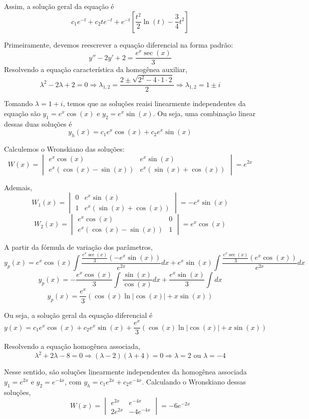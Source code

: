 \documentclass[oneside,12pt,a4paper]{report}
\begin{document}
\begin{resolucao}
    Assim, a solução geral da equação é
    \[\boxed{c_1e^{-t}+c_2te^{-t}+e^{-t}\left[\frac{t^2}{2}\ln(t)-\frac{3}{4}t^2\right]}\]

    \itemresolucao Primeiramente, devemos reescrever a equação diferencial na forma padrão:
    \[y''-2y'+2=\frac{e^x\sec(x)}{3}\]
    Resolvendo a equação característica da homogênea auxiliar,
    \[\lambda^2-2\lambda+2=0\Rightarrow\lambda_{1,2}=\frac{2\pm\sqrt{2^2-4\cdot1\cdot2}}{2}\Rightarrow\lambda_{1,2}=1\pm i\]

    Tomando $\lambda=1+i$, temos que as soluções reaisi linearmente independentes da equação são $y_1=e^x\cos(x)$ e $y_2=e^x\sin(x)$. Ou seja, uma combinação linear dessas duas soluções é
    \[y_h(x)=c_1e^x\cos(x)+c_2e^x\sin(x)\]

    Calculemos o Wronskiano das soluções:
    \[W(x)=\begin{vmatrix}
        e^{x}\cos(x) & e^{x}\sin(x)\\
        e^{x}(\cos(x)-\sin(x)) & e^{x}(\sin(x)+\cos(x))
    \end{vmatrix}=e^{2x}\]

    Ademais,
    \[W_1(x)=\begin{vmatrix}
        0 & e^{x}\sin(x)\\
        1 & e^{x}(\sin(x)+\cos(x))
    \end{vmatrix}=-e^{x}\sin(x)\] 
    \[W_2(x)=\begin{vmatrix}
        e^{x}\cos(x) & 0\\
        e^{x}(\cos(x)-\sin(x)) & 1
    \end{vmatrix}=e^{x}\cos(x)\]

    A partir da fórmula de variação dos parâmetros,
    \[y_p(x)=e^x\cos(x)\int\frac{\frac{e^x\sec(x)}{3}(-e^x\sin(x))}{e^{2x}}dx+e^x\sin(x)\int\frac{\frac{e^x\sec(x)}{3}(e^x\cos(x))}{e^{2x}}dx\]
    \[y_p(x)=-\frac{e^x\cos(x)}{3}\int\frac{\sin(x)}{\cos(x)}dx+\frac{e^x\sin(x)}{3}\int dx\]
    \[y_p(x)=\frac{e^x}{3}(\cos(x)\ln|\cos(x)|+x\sin(x))\]

    Ou seja, a solução geral da equação diferencial é
    \[\boxed{y(x)=c_1e^x\cos(x)+c_2e^x\sin(x)+\frac{e^x}{3}(\cos(x)\ln|\cos(x)|+x\sin(x))}\]

    \itemresolucao Resolvendo a equação homogênea associada,
    \[\lambda^2+2\lambda-8=0\Rightarrow(\lambda-2)(\lambda+4)=0\Rightarrow\lambda=2\text{ ou }\lambda=-4\]

    Nesse sentido, são soluções linearmente independentes da homogênea associada $y_1=e^{2x}$ e $y_2=e^{-4x}$, com $y_h=c_1e^{2x}+c_2e^{-4x}$. Calculando o Wronskiano dessas soluções,
    \[W(x)=\begin{vmatrix}
        e^{2x} & e^{-4x}\\
        2e^{2x} & -4e^{-4x}
    \end{vmatrix}=-6e^{-2x}\]


\end{resolucao}
\end{document}
